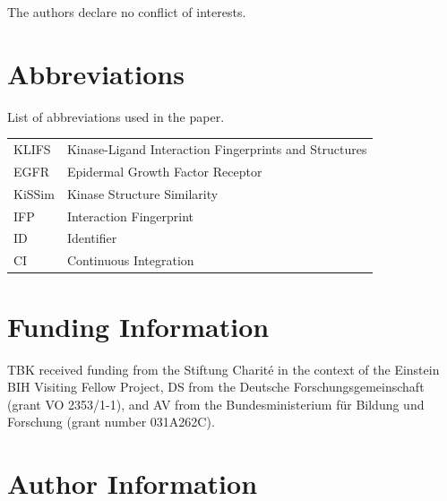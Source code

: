 \documentclass[9pt,training,ASAPversion]{livecoms}
\begin{document}
The authors declare no conflict of interests.

\section*{Abbreviations}
List of abbreviations used in the paper.
\begin{table}[H]
    \centering
    \begin{tabular}{l l}
        KLIFS & Kinase-Ligand Interaction Fingerprints and Structures\\
        EGFR & Epidermal Growth Factor Receptor\\
        KiSSim & Kinase Structure Similarity\\
        IFP & Interaction Fingerprint \\
        ID & Identifier\\
        CI & Continuous Integration
    \end{tabular}
\end{table}


\section*{Funding Information}
TBK received funding from the Stiftung Charit\'e in the context of the Einstein BIH Visiting Fellow Project, DS from the Deutsche Forschungsgemeinschaft (grant VO 2353/1-1), and AV from the Bundesministerium f\"ur Bildung und Forschung (grant number 031A262C).

\section*{Author Information}
\makeorcid




\end{document}
